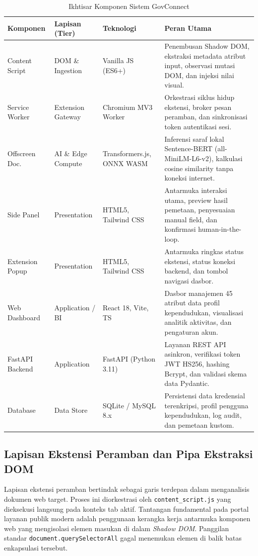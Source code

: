 \documentclass[conference]{IEEEtran}
\begin{document}
\begin{table}[!htbp]
\caption{Ikhtisar Komponen Sistem GovConnect}
\label{tab:system_components}
\centering
\scriptsize
\setlength{\tabcolsep}{2.5pt}
\begin{tabularx}{\columnwidth}{l l p{2.1cm} X}
\toprule
\textbf{Komponen} & \textbf{Lapisan (Tier)} & \textbf{Teknologi} & \textbf{Peran Utama} \\
\midrule
Content Script & DOM \& Ingestion & Vanilla JS (ES6+) & Penembusan Shadow DOM, ekstraksi metadata atribut input, observasi mutasi DOM, dan injeksi nilai visual. \\
Service Worker & Extension Gateway & Chromium MV3 Worker & Orkestrasi siklus hidup ekstensi, broker pesan peramban, dan sinkronisasi token autentikasi sesi. \\
Offscreen Doc. & AI \& Edge Compute & Transformers.js, ONNX WASM & Inferensi saraf lokal Sentence-BERT (all-MiniLM-L6-v2), kalkulasi cosine similarity tanpa koneksi internet. \\
Side Panel & Presentation & HTML5, Tailwind CSS & Antarmuka interaksi utama, preview hasil pemetaan, penyesuaian manual field, dan konfirmasi human-in-the-loop. \\
Extension Popup & Presentation & HTML5, Tailwind CSS & Antarmuka ringkas status ekstensi, status koneksi backend, dan tombol navigasi dasbor. \\
Web Dashboard & Application / BI & React 18, Vite, TS & Dasbor manajemen 45 atribut data profil kependudukan, visualisasi analitik aktivitas, dan pengaturan akun. \\
FastAPI Backend & Application & FastAPI (Python 3.11) & Layanan REST API asinkron, verifikasi token JWT HS256, hashing Bcrypt, dan validasi skema data Pydantic. \\
Database & Data Store & SQLite / MySQL 8.x & Persistensi data kredensial terenkripsi, profil pengguna kependudukan, log audit, dan pemetaan kustom. \\
\bottomrule
\end{tabularx}
\end{table}

\subsection{Lapisan Ekstensi Peramban dan Pipa Ekstraksi DOM}
Lapisan ekstensi peramban bertindak sebagai garis terdepan dalam menganalisis dokumen web target. Proses ini diorkestrasi oleh \texttt{content\_script.js} yang dieksekusi langsung pada konteks tab aktif. Tantangan fundamental pada portal layanan publik modern adalah penggunaan kerangka kerja antarmuka komponen web yang mengisolasi elemen masukan di dalam \textit{Shadow DOM}. Panggilan standar \texttt{document.querySelectorAll} gagal menemukan elemen di balik batas enkapsulasi tersebut.
\end{document}
